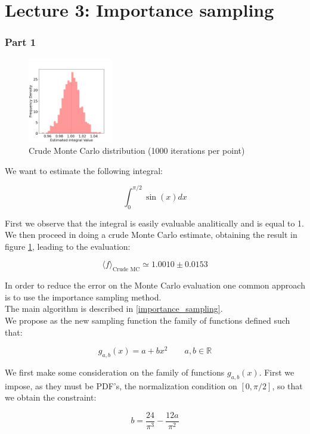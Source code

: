 
\chapter*{Lecture 3: Importance sampling}

\subsection*{Part 1}

\begin{figure}
    \centering
    \includegraphics[width=0.33\textwidth]{FIG/exercise_3_images/crude_mc.png}
  \caption{Crude Monte Carlo distribution (1000 iterations per point)}
  \label{crude_mc}
  \end{figure}

We want to estimate the following integral:

$$ \int_0^{\pi/2} \sin(x) dx $$

First we observe that the integral is easily evaluable analitically and is equal to 1. \\
We then proceed in doing a crude Monte Carlo estimate, obtaining the result in figure \ref{crude_mc}, leading to the evaluation:

$$ \langle f \rangle_{\text{Crude MC}} \simeq 1.0010 \pm 0.0153 $$

In order to reduce the error on the Monte Carlo evaluation one common approach is to use the importance sampling method. \\
The main algorithm is described in \ref{importance_sampling}. \\
We propose as the new sampling function the family of functions defined such that:

$$ g_{a,b}(x) = a+ bx^2 \qquad a,b \in \mathbb{R}  $$

We first make some consideration on the family of functions $g_{a,b}(x)$.
First we impose, as they must be PDF's, the normalization condition on $[0, \pi/2]$, so that we obtain the constraint:

$$ b = \frac{24}{\pi^3} - \frac{12 a}{\pi^2} $$

